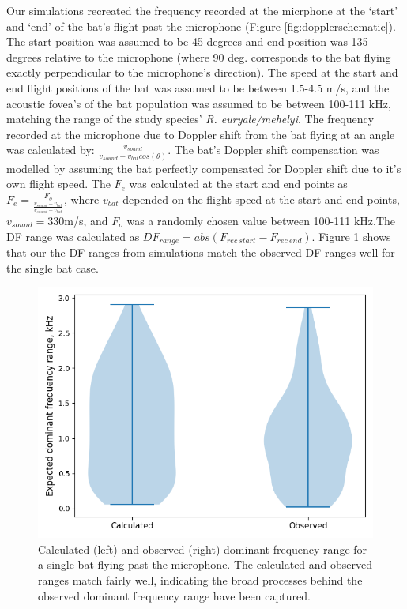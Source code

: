 \documentclass[
]{book}
\begin{document}
Our simulations recreated the frequency recorded at the micrphone at the `start' and `end' of the bat's flight past the microphone (Figure \ref{fig:dopplerschematic}). The start position was assumed to be 45 degrees and end position was 135 degrees relative to the microphone (where 90 deg. corresponds to the bat flying exactly perpendicular to the microphone's direction). The speed at the start and end flight positions of the bat was assumed to be between 1.5-4.5 m/s, and the acoustic fovea's of the bat population was assumed to be between 100-111 kHz, matching the range of the study species' \emph{R. euryale/mehelyi}. The frequency recorded at the microphone due to Doppler shift from the bat flying at an angle was calculated by: \(\frac{v_{sound}}{v_{sound}-v_{bat}cos(\theta)}\). The bat's Doppler shift compensation was modelled by assuming the bat perfectly compensated for Doppler shift due to it's own flight speed. The \(F_{e}\) was calculated at the start and end points as \(F_{e}=\frac{F_{o}}{\frac{v_{sound}+v_{bat}}{v_{sound}-v_{bat}}}\), where \(v_{bat}\) depended on the flight speed at the start and end points, \(v_{sound}=330\)m/s, and \(F_{o}\) was a randomly chosen value between 100-111 kHz.The DF range was calculated as \(DF_{range}=abs(F_{rec\:start}-F_{rec\:end})\). Figure \ref{fig:singledomfreqrangesim} shows that our the DF ranges from simulations match the observed DF ranges well for the single bat case.

\begin{figure}
\includegraphics[width=1\linewidth]{original_papers/hbc-paper/combined_analysis/domfreq_range_single} \caption{\label{fig:singledomfreqrangesim} Calculated (left) and observed (right) dominant frequency range for a single bat flying past the microphone. The calculated and observed ranges match fairly well, indicating the broad processes behind the observed  dominant frequency range have been captured.}\label{fig:singledomfreqrangesim}
\end{figure}
\end{document}
